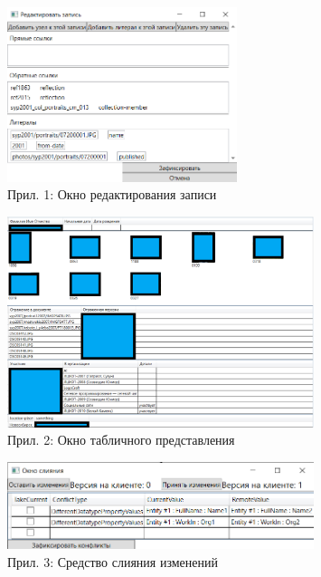 \documentclass[12pt]{article}
\begin{document}
\begin{figure}[!ht]
    \centering
    \includegraphics[width=0.6\textwidth]{_images/edit_window.png}
    \caption*{Прил. 1: Окно редактирования записи}
    \label{app:edit_node_view}
\end{figure}

\begin{figure}[!ht]
    \centering
    \includegraphics[width=0.8\textwidth]{_images/table_view.png}
    \caption*{Прил. 2: Окно табличного представления}
    \label{app:table_view}
\end{figure}

\begin{figure}
    \centering
    \includegraphics[width=0.8\textwidth]{_images/merge_tool.png}
    \caption*{Прил. 3: Средство слияния изменений}
    \label{app:merge_tool}
\end{figure}
\pagebreak
\end{document}
